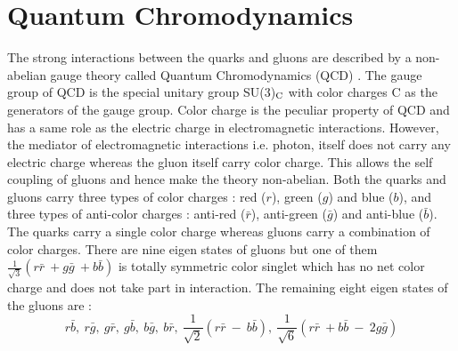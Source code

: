 \section{Quantum Chromodynamics}
The strong interactions between the quarks and gluons are described by a non-abelian gauge theory called Quantum Chromodynamics (QCD) \cite{Ellis:1991qj, Halzen:1984mc}. The gauge group of QCD is the special unitary group SU(3)$_{\rm C}$ with color charges C as the generators of the gauge group. Color charge is the peculiar property of QCD and has a same role as the electric charge in electromagnetic interactions. However, the mediator of electromagnetic interactions i.e. photon, itself does not carry any electric charge whereas the gluon itself carry color charge. This allows the self coupling of gluons and hence make the theory non-abelian. Both the quarks and gluons carry three types of color charges : red ($r$), green ($g$) and blue ($b$), and three types of anti-color charges : anti-red ($\bar{r}$), anti-green ($\bar{g}$) and anti-blue ($\bar{b}$). The quarks carry a single color charge whereas gluons carry a combination of color charges. There are nine eigen states of gluons but one of them $\frac{1}{\sqrt{3}}(r\bar{r}~\plus g\bar{g}~\plus b\bar{b})$ is totally symmetric color singlet which has no net color charge and does not take part in interaction. The remaining eight eigen states of the gluons are :
\begin{equation}
r\bar{b},~r\bar{g},~g\bar{r},~g\bar{b},~b\bar{g},~b\bar{r},~\frac{1}{\sqrt{2}}(r\bar{r}~-~b\bar{b}),~\frac{1}{\sqrt{6}}(r\bar{r}~\plus b\bar{b}~-~2g\bar{g}) 
\end{equation}

